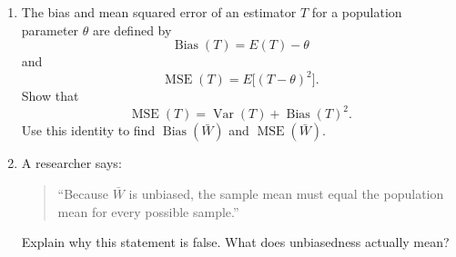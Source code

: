 \documentclass[11pt]{article}
\begin{document}
\begin{enumerate}[label=(\alph*), leftmargin=*]
\item The bias and mean squared error of an estimator \(T\) for a population
parameter \(\theta\) are defined by
\[
\operatorname{Bias}(T)=E(T)-\theta
\]
and
\[
\operatorname{MSE}(T)=E\bigl[(T-\theta)^2\bigr].
\]
Show that
\[
\operatorname{MSE}(T)
=
\operatorname{Var}(T)+\operatorname{Bias}(T)^2.
\]
Use this identity to find \(\operatorname{Bias}(\bar W)\) and
\(\operatorname{MSE}(\bar W)\).

\item A researcher says:
\begin{quote}
``Because \(\bar W\) is unbiased, the sample mean must equal the population mean
for every possible sample.''
\end{quote}
Explain why this statement is false. What does unbiasedness actually mean?

\end{enumerate}
\end{document}
